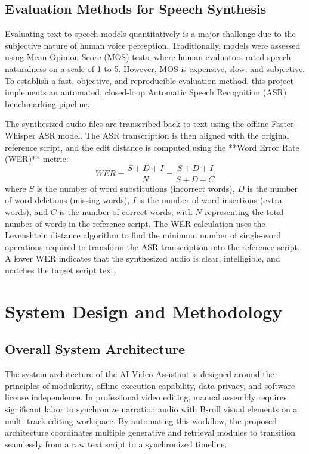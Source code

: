 \documentclass[a4paper,12pt]{report}
\begin{document}
\section{Evaluation Methods for Speech Synthesis}
Evaluating text-to-speech models quantitatively is a major challenge due to the subjective nature of human voice perception. Traditionally, models were assessed using Mean Opinion Score (MOS) tests, where human evaluators rated speech naturalness on a scale of 1 to 5. However, MOS is expensive, slow, and subjective. To establish a fast, objective, and reproducible evaluation method, this project implements an automated, closed-loop Automatic Speech Recognition (ASR) benchmarking pipeline.

The synthesized audio files are transcribed back to text using the offline Faster-Whisper ASR model. The ASR transcription is then aligned with the original reference script, and the edit distance is computed using the **Word Error Rate (WER)** metric:
\begin{equation}
    WER = \frac{S + D + I}{N} = \frac{S + D + I}{S + D + C}
\end{equation}
where $S$ is the number of word substitutions (incorrect words), $D$ is the number of word deletions (missing words), $I$ is the number of word insertions (extra words), and $C$ is the number of correct words, with $N$ representing the total number of words in the reference script. The WER calculation uses the Levenshtein distance algorithm to find the minimum number of single-word operations required to transform the ASR transcription into the reference script. A lower WER indicates that the synthesized audio is clear, intelligible, and matches the target script text.
\newpage

\chapter{System Design and Methodology}
\label{ch:design}

\section{Overall System Architecture}
The system architecture of the AI Video Assistant is designed around the principles of modularity, offline execution capability, data privacy, and software license independence. In professional video editing, manual assembly requires significant labor to synchronize narration audio with B-roll visual elements on a multi-track editing workspace. By automating this workflow, the proposed architecture coordinates multiple generative and retrieval modules to transition seamlessly from a raw text script to a synchronized timeline.
\end{document}
